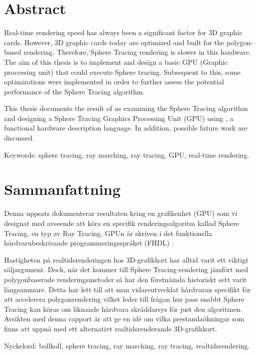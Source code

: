 \thispagestyle{plain}			%
\setlength{\parskip}{10pt}
\setlength{\parindent}{0pt}

\section*{Abstract}
	
	Real-time rendering speed has always been a significant factor for 3D
	graphic cards. However, 3D graphic cards today are optimized and built for
	the polygon-based rendering. Therefore, Sphere Tracing rendering is slower
	in this hardware. The aim of this thesis is to implement and design a
	basic GPU (Graphic proccesing unit) that could execute Sphere tracing.
	Subsequent to this, some optimizations were implemented in order to further
	assess the potential performance of the Sphere Tracing algorithm.
	
	This thesis documents the result of us examining the Sphere Tracing
	algorithm and designing a Sphere Tracing Graphics Processing Unit (GPU) 
	using \clash, a functional hardware description language. In addition, 
	possible future work are discussed.

	\vfill
	Keywords: sphere tracing, ray marching, ray tracing, GPU, real-time rendering.

\newpage
\thispagestyle{plain}

\section*{Sammanfattning}
	
	Denna uppsats dokumenterar resultaten kring en grafikenhet (GPU) som vi
	designat med avseende att köra en specifik renderingsalgoritm kallad Sphere
	Tracing, en typ av Ray Tracing. GPUn är skriven i det funktionella
	hårdvarubeskrivande programmeringsspråket (FHDL) \clash.
	
	Hastigheten på realtidsrenderingen hos 3D-grafikkort har alltid varit ett 
	viktigt säljargument. Dock, när det kommer till Sphere Tracing-rendering
	jämfört med polygonbaserade renderingsmetoder så har den förstnämda
	historiskt sett varit långsammare. Detta har lett till att man
	vidareutvecklat hårdvaran specifikt för att accelerera polygonrendering
	vilket leder till frågan hur pass snabbt Sphere Tracing kan köras om
	liknande hårdvara skräddarsys för just den algoritmen. Avsikten med denna
	rapport är att ge en idé om vilka prestandaökningar som finns att uppnå
	med ett alternativt realtidsrenderande 3D-grafikkort.

	\vfill
	Nyckelord: bollkoll, sphere tracing, ray marching, ray tracing, realtidsrendering.


\newpage
\thispagestyle{empty}
\mbox{}
